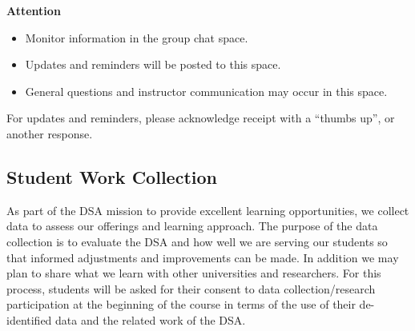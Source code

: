 \documentclass[
  letterpaper,
  DIV=11,
  numbers=noendperiod]{scrreprt}
\providecommand{\tightlist}{%
  \setlength{\itemsep}{0pt}\setlength{\parskip}{0pt}}
\begin{document}
\begin{tcolorbox}[enhanced jigsaw, toprule=.15mm, colback=white, arc=.35mm, colframe=quarto-callout-note-color-frame, bottomrule=.15mm, rightrule=.15mm, breakable, leftrule=.75mm, left=2mm, opacityback=0]
\begin{minipage}[t]{5.5mm}
\textcolor{quarto-callout-note-color}{\faInfo}
\end{minipage}%
\begin{minipage}[t]{\textwidth - 5.5mm}

\vspace{-3mm}\textbf{{Attention}}\vspace{3mm}

\begin{itemize}
\tightlist
\item
  {Monitor information in the group chat space.}
\end{itemize}

\end{minipage}%
\end{tcolorbox}

\begin{itemize}
\tightlist
\item
  Updates and reminders will be posted to this space.
\item
  General questions and instructor communication may occur in this
  space.
\end{itemize}

For updates and reminders, please acknowledge receipt with a ``thumbs
up'', or another response.

\subsection{Student Work Collection}\label{student-work-collection}

As part of the DSA mission to provide excellent learning opportunities,
we collect data to assess our offerings and learning approach. The
purpose of the data collection is to evaluate the DSA and how well we
are serving our students so that informed adjustments and improvements
can be made. In addition we may plan to share what we learn with other
universities and researchers. For this process, students will be asked
for their consent to data collection/research participation at the
beginning of the course in terms of the use of their de-identified data
and the related work of the DSA.
\end{document}
